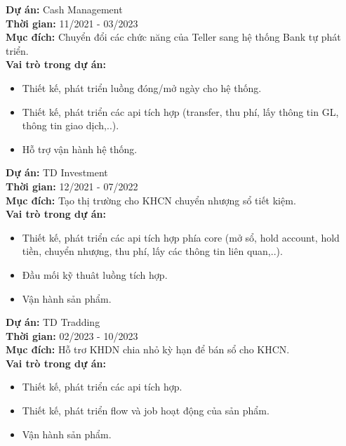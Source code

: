 \documentclass[11pt,a4paper,sans]{moderncv}
\begin{document}
\begin{mdframed}[style=ProjectFrame]
	\textbf{Dự án:} Cash Management \\
	\textbf{Thời gian:} 11/2021 - 03/2023 \\
	\textbf{Mục đích:} Chuyển đổi các chức năng của Teller sang hệ thống Bank tự phát triển.\\
	\textbf{Vai trò trong dự án:}
	\begin{itemize}[leftmargin=0.6cm,noitemsep,topsep=0pt,label=-]
	\item Thiết kế, phát triển luồng đóng/mở ngày cho hệ thống.
	\item Thiết kế, phát triển các api tích hợp (transfer, thu phí, lấy thông tin GL, thông tin giao dịch,..).
	\item Hỗ trợ vận hành hệ thống.
	\end{itemize}
\end{mdframed}

\begin{mdframed}[style=ProjectFrame]
	\textbf{Dự án:} TD Investment \\
	\textbf{Thời gian:} 12/2021 - 07/2022 \\
	\textbf{Mục đích:} Tạo thị trường cho KHCN chuyển nhượng sổ tiết kiệm.\\
	\textbf{Vai trò trong dự án:}
	\begin{itemize}[leftmargin=0.6cm,noitemsep,topsep=0pt,label=-]
		\item Thiết kế, phát triển các api tích hợp phía core (mở sổ, hold account, hold tiền, chuyển nhượng, thu phí, lấy các thông tin liên quan,..).
		\item Đầu mối kỹ thuât luồng tích hợp.
		\item Vận hành sản phẩm.
	\end{itemize}
\end{mdframed}

\begin{mdframed}[style=ProjectFrame]
	\textbf{Dự án:} TD Tradding\\
	\textbf{Thời gian:} 02/2023 - 10/2023 \\
	\textbf{Mục đích:} Hỗ trơ KHDN chia nhỏ kỳ hạn để bán sổ cho KHCN.\\
	\textbf{Vai trò trong dự án:}
	\begin{itemize}[leftmargin=0.6cm,noitemsep,topsep=0pt,label=-]
		\item Thiết kế, phát triển các api tích hợp.
		\item Thiết kế, phát triển flow và job hoạt động của sản phẩm.
		\item Vận hành sản phẩm.
	\end{itemize}
\end{mdframed}
\end{document}
